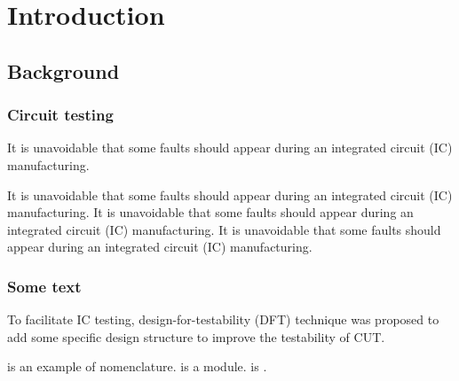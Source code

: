 \chapter{Introduction}
\section{Background}
\subsection{Circuit testing}
It is unavoidable that some faults should appear during an integrated circuit (IC) manufacturing.


\begin{center}
  It is unavoidable that some faults should appear during an integrated circuit
  (IC) manufacturing. It is unavoidable that some faults should appear during an
  integrated circuit (IC) manufacturing. It is unavoidable that some faults
  should appear during an integrated circuit (IC) manufacturing.
\end{center}

\subsection{Some text}

To facilitate IC testing,  design-for-testability (DFT) technique was proposed to add some specific design structure to improve the testability of CUT\cite{hithesis2017,cnarticle}. 

 is an example of nomenclature.  is a  module.  is .

